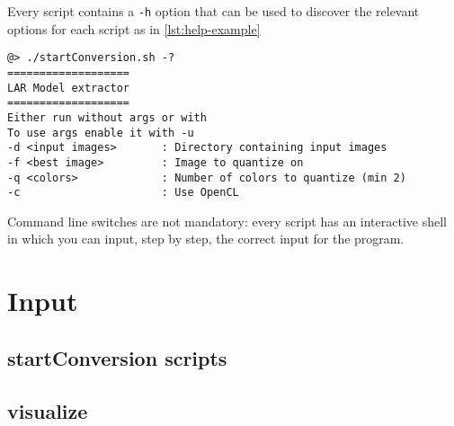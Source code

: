 \documentclass[a4paper,twoside,10pt]{report}
\begin{document}
Every script contains a \texttt{-h} option that can be used to discover the relevant options for each script as in \ref{lst:help-example}

\begin{lstlisting}[style=bash-style,label=lst:help-example]
@> ./startConversion.sh -?
===================
LAR Model extractor
===================
Either run without args or with
To use args enable it with -u
-d <input images>       : Directory containing input images
-f <best image>         : Image to quantize on
-q <colors>             : Number of colors to quantize (min 2)
-c                      : Use OpenCL
\end{lstlisting}

Command line switches are not mandatory: every script has an interactive shell in which you can input, step by step, the correct input for the program.

\section{Input}
\subsection{startConversion scripts}

\subsection{visualize}







\nocite{*} %




\appendix

\end{document}
